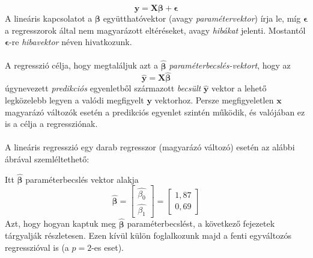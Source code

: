 \documentclass[14p]{report}
\def\pmb{\boldsymbol}
\def\ebeta{\hat{\pmb{\beta}}}
\def\e{\epsilon}
\begin{document}
	\[
	\pmb{y} = \pmb{X}\pmb{\beta} + \pmb{\epsilon}
	\]
	A lineáris kapcsolatot a $\pmb{\beta}$ együtthatóvektor (avagy \emph{paramétervektor}) írja le, míg $\pmb{\e}$ a regresszorok által nem magyarázott eltéréseket, avagy \emph{hibákat} jelenti. Mostantól $\pmb{\e}$-re \emph{hibavektor} néven hivatkozunk.
	\\
	\\
	A regresszió célja, hogy megtaláljuk azt a $\ebeta$ \emph{paraméterbecslés-vektort}, hogy az 
	\[
		\hat{\pmb{y}} = \pmb{X}\ebeta 
	\]
	úgynevezett \emph{predikciós} egyenletből származott \emph{becsült} $\hat{\pmb{y}}$ vektor a lehető legközelebb legyen a valódi megfigyelt $\pmb{y}$ vektorhoz. Persze megfigyeletlen $\pmb{x}$ magyarázó változók esetén a predikciós egyenlet szintén működik, és valójában ez is a célja a regressziónak.
	\\
	\\
	A lineáris regresszió egy darab regresszor (magyarázó változó) esetén az alábbi ábrával szemléltethető:
	
	\begin{center}
	\end{center}
	Itt $\ebeta$ paraméterbecslés vektor alakja
	\[
	\ebeta = 
	\begin{bmatrix}
		\hat{\beta_0} \\
		\hat{\beta_1}
	\end{bmatrix}
	=
	\begin{bmatrix}
		1,87 \\
		0,69
	\end{bmatrix}
	\]
	Azt, hogy hogyan kaptuk meg $\ebeta$ paraméterbecslést, a következő fejezetek tárgyalják részletesen. Ezen kívül külön foglalkozunk majd a fenti egyváltozós regresszióval is (a $p=2$-es eset).
	
\end{document}
